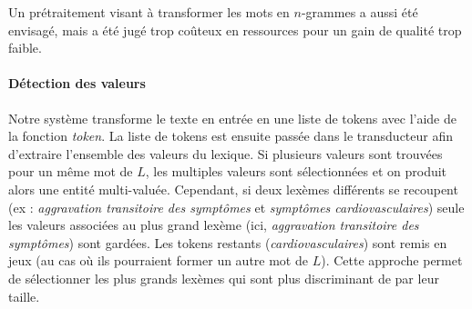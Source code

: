 Un prétraitement visant à transformer les mots en $n$-grammes a aussi été envisagé, mais a été jugé trop coûteux en ressources pour un gain de qualité trop faible.

\paragraph{Détection des valeurs}
Notre système transforme le texte en entrée en une liste de tokens avec l'aide de la fonction \textit{token}.
La liste de tokens est ensuite passée dans le transducteur afin d'extraire l'ensemble des valeurs du lexique.
Si plusieurs valeurs sont trouvées pour un même mot de $L$, les multiples valeurs sont sélectionnées et on produit alors une entité multi-valuée.
Cependant, si deux lexèmes différents se recoupent (ex : \emph{aggravation transitoire des symptômes} et \emph{symptômes cardiovasculaires}) seule les valeurs associées au plus grand lexème (ici, \emph{aggravation transitoire des symptômes}) sont gardées.
Les tokens restants (\emph{cardiovasculaires}) sont remis en jeux (au cas où ils pourraient former un autre mot de $L$).
Cette approche permet de sélectionner les plus grands lexèmes qui sont plus discriminant de par leur taille.

